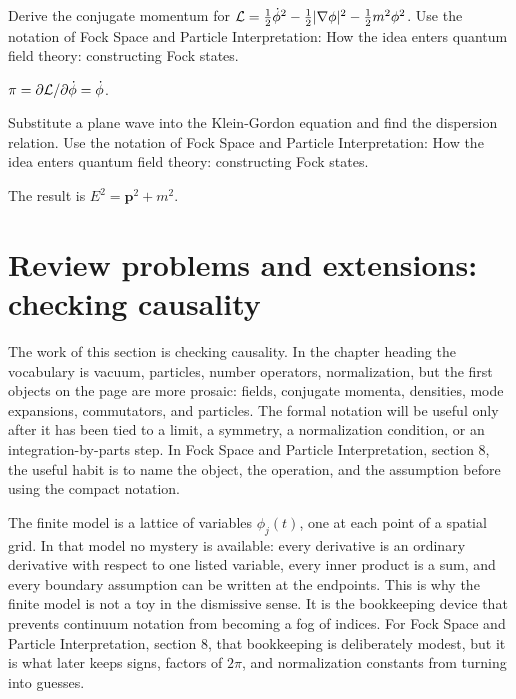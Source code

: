 \begin{exercise}
Derive the conjugate momentum for \(\mathcal L=\frac12\dot\phi^2-\frac12|\nabla\phi|^2-\frac12m^2\phi^2\).  Use the notation of Fock Space and Particle Interpretation: How the idea enters quantum field theory: constructing Fock states.
\begin{answer}
\(\pi=\partial\mathcal L/\partial\dot\phi=\dot\phi\).
\end{answer}
\end{exercise}

\begin{exercise}
Substitute a plane wave into the Klein-Gordon equation and find the dispersion relation.  Use the notation of Fock Space and Particle Interpretation: How the idea enters quantum field theory: constructing Fock states.
\begin{answer}
The result is \(E^2=\bm p^2+m^2\).
\end{answer}
\end{exercise}



\section{Review problems and extensions: checking causality}

The work of this section is checking causality.  In the chapter heading the vocabulary is vacuum, particles, number operators, normalization, but the first objects on the page are more prosaic: fields, conjugate momenta, densities, mode expansions, commutators, and particles.  The formal notation will be useful only after it has been tied to a limit, a symmetry, a normalization condition, or an integration-by-parts step.  In Fock Space and Particle Interpretation, section 8, the useful habit is to name the object, the operation, and the assumption before using the compact notation.

The finite model is a lattice of variables \(\phi_j(t)\), one at each point of a spatial grid.  In that model no mystery is available: every derivative is an ordinary derivative with respect to one listed variable, every inner product is a sum, and every boundary assumption can be written at the endpoints.  This is why the finite model is not a toy in the dismissive sense.  It is the bookkeeping device that prevents continuum notation from becoming a fog of indices.  For Fock Space and Particle Interpretation, section 8, that bookkeeping is deliberately modest, but it is what later keeps signs, factors of \(2\pi\), and normalization constants from turning into guesses.

